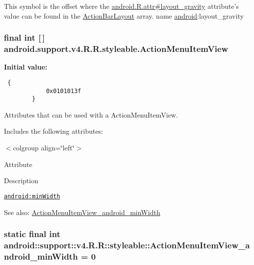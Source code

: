 This symbol is the offset where the \hyperlink{}{android.R.attr\#layout\_\-gravity} attribute's value can be found in the \hyperlink{classandroid_1_1support_1_1v4_1_1_r_1_1styleable_af2d29b7fdd4bc3d0c0d77e61105407e}{ActionBarLayout} array.  name \hyperlink{namespaceandroid}{android}:layout\_\-gravity \hypertarget{classandroid_1_1support_1_1v4_1_1_r_1_1styleable_2f03c9fcd2a52e8fee3ae3171db87b03}{
\subsubsection[{ActionMenuItemView}]{\setlength{\rightskip}{0pt plus 5cm}final int \mbox{[}$\,$\mbox{]} android.support.v4.R.R.styleable.ActionMenuItemView}}
\label{classandroid_1_1support_1_1v4_1_1_r_1_1styleable_2f03c9fcd2a52e8fee3ae3171db87b03}


\textbf{Initial value:}

\begin{Code}\begin{verbatim} {
            0x0101013f
        }
\end{verbatim}
\end{Code}
Attributes that can be used with a ActionMenuItemView. 

Includes the following attributes: \begin{TabularC}{0}
\hline
\end{TabularC}
$<$colgroup align=\char`\"{}left\char`\"{}$>$ 

Attribute

Description 

{\tt \hyperlink{classandroid_1_1support_1_1v4_1_1_r_1_1styleable_ffcde03d222aaaad9bf2139f8e587b0e}{android:minWidth}}

\begin{Desc}
\item[See also:]\hyperlink{classandroid_1_1support_1_1v4_1_1_r_1_1styleable_ffcde03d222aaaad9bf2139f8e587b0e}{ActionMenuItemView\_\-android\_\-minWidth} \end{Desc}
\hypertarget{classandroid_1_1support_1_1v4_1_1_r_1_1styleable_ffcde03d222aaaad9bf2139f8e587b0e}{
\subsubsection[{ActionMenuItemView\_\-android\_\-minWidth}]{\setlength{\rightskip}{0pt plus 5cm}static final int android::support::v4.R.R::styleable::ActionMenuItemView\_\-android\_\-minWidth = 0}}
\label{classandroid_1_1support_1_1v4_1_1_r_1_1styleable_ffcde03d222aaaad9bf2139f8e587b0e}


